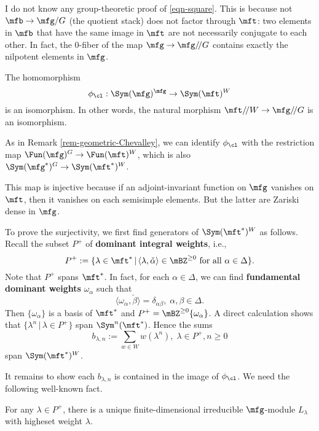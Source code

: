 	\begin{warn}
		I do not know any group-theoretic proof of \eqref{eqn-square}. This is because not $\mfb \to \mfg/G$ (the quotient stack) does not factor through $\mft$: two elements in $\mfb$ that have the same image in $\mft$ are not necessarily conjugate to each other. In fact, the $0$-fiber of the map $\mfg \to \mfg/\!/G$ contains exactly the nilpotent elements in $\mfg$.
	\end{warn}

	\begin{thm}[Chevalley]
		The homomorphism 
		\[
			\phi_\cl: \Sym(\mfg)^\mfg  \to  \Sym(\mft)^W
		\]
		is an isomorphism. In other words, the natural morphism $\mft/\!/ W \to \mfg/\!/G$ is an isomorphism.
	\end{thm}

	\proof
		As in Remark \ref{rem-geometric-Chevalley}, we can identify $\phi_\cl$ with the restriction map $\Fun(\mfg)^G \to \Fun(\mft)^W$, which is also $\Sym(\mfg^*)^G \to \Sym(\mft^*)^W$.

		This map is injective because if an adjoint-invariant function on $\mfg$ vanishes on $\mft$, then it vanishes on each semisimple elements. But the latter are Zariski dense in $\mfg$.

		To prove the surjectivity, we first find generators of $\Sym(\mft^*)^W$ as follows. Recall the subset $P^+$ of \textbf{dominant integral weights}, i.e.,
		\[
			P^+ := \{ \lambda\in \mft^*\,\vert\, \langle\lambda,\check\alpha\rangle \in \mBZ^{\ge 0} \textrm{ for all }  \alpha\in \Delta \}.
		\]
		Note that $P^+$ spans $\mft^*$. In fact, for each $\alpha\in \Delta$, we can find \textbf{fundamental dominant weights} $\omega_\alpha$ such that
		\[
			\langle \omega_\alpha,\check \beta \rangle = \delta_{\alpha\beta},\; \alpha,\beta\in \Delta.
		\]
		Then $\{\omega_\alpha\}$ is a basis of $\mft^*$ and $P^+= \mBZ^{\ge 0}\{\omega_\alpha\}$. A direct calculation shows that $\{\lambda^n\,\vert\, \lambda\in P^+ \}$ span $\Sym^n(\mft^*)$. Hence the sums
		\[
			b_{\lambda,n}:= \sum_{w\in W} w( \lambda^n ),\; \lambda \in P^+, n\ge 0
		\]
		span $\Sym(\mft^*)^W$.
		
		It remains to show each $b_{\lambda,n}$ is contained in the image of $\phi_\cl$. We need the following well-known fact.

		\begin{thm}[Weyl]
			For any $\lambda\in P^+$, there is a unique finite-dimensional irreducible $\mfg$-module $L_\lambda$ with higheset weight $\lambda$.
		\end{thm}

